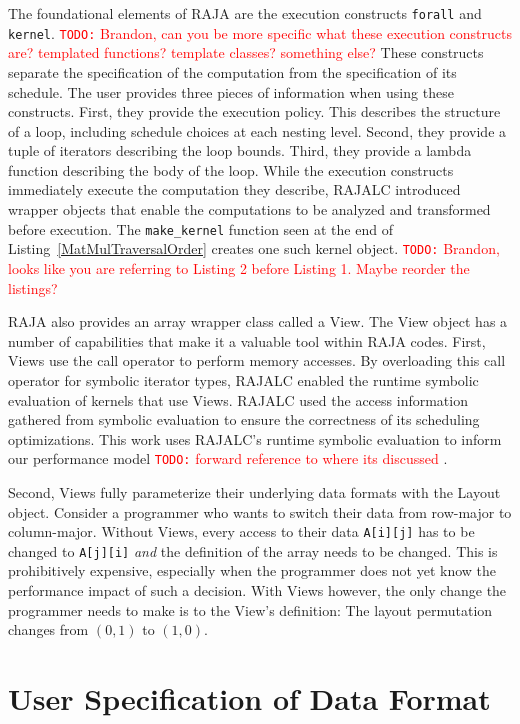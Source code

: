 \documentclass[sigconf, table]{acmart}
\newcommand{\todo}[1]{{\textcolor{red}{{\tt{TODO:}}\,\,#1 }}}
\begin{document}
The foundational elements of RAJA are the execution constructs \verb.forall. and \verb.kernel.. 
\todo{Brandon, can you be more specific what these execution constructs are?  templated functions?  template classes?
something else?}
These constructs separate the specification of the computation from the specification of its schedule. 
The user provides three pieces of information when using these constructs. 
First, they provide the execution policy. 
This describes the structure of a loop, including schedule choices at each nesting level. 
Second, they provide a tuple of iterators describing the loop bounds. 
Third, they provide a lambda function describing the body of the loop.
While the execution constructs immediately execute the computation they describe, RAJALC introduced wrapper objects that enable the computations to be analyzed and transformed before execution. 
The \verb.make_kernel. function seen at the end of Listing~\ref{MatMulTraversalOrder} creates one such kernel object.
\todo{Brandon, looks like you are referring to Listing 2 before Listing 1.  Maybe reorder the listings?}

RAJA also provides an array wrapper class called a View.
The View object has a number of capabilities that make it a valuable tool within RAJA codes.
First, Views use the call operator to perform memory accesses. 
By overloading this call operator for symbolic iterator types, RAJALC enabled the runtime symbolic evaluation of kernels that use Views.
RAJALC used the access information gathered from symbolic evaluation to ensure the correctness of its scheduling optimizations.
This work uses RAJALC's runtime symbolic evaluation to inform our performance model \todo{forward reference to where its discussed}.

Second, Views fully parameterize their underlying data formats with the Layout object.
Consider a programmer who wants to switch their data from row-major to column-major. 
Without Views, every access to their data \verb.A[i][j]. has to be changed to \verb.A[j][i]. \textit{and} the definition of the array needs to be changed. 
This is prohibitively expensive, especially when the programmer does not yet know the performance impact of such a decision.
With Views however, the only change the programmer needs to make is to the View's definition: The layout permutation changes from $(0,1)$ to $(1,0)$.

\section{User Specification of Data Format}
\end{document}
